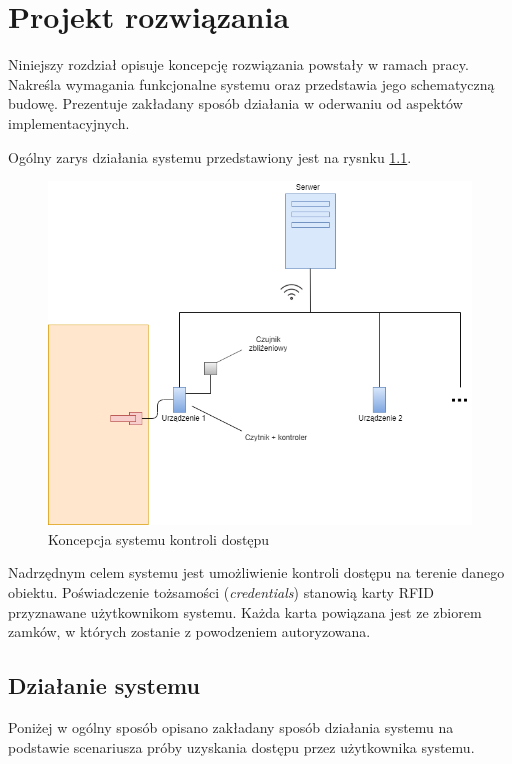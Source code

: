 \chapter{Projekt rozwiązania}
\label{chap:hl-arch}

        Niniejszy rozdział opisuje koncepcję rozwiązania powstały w ramach pracy. Nakreśla wymagania funkcjonalne systemu oraz przedstawia jego schematyczną budowę. Prezentuje zakładany sposób działania w oderwaniu od aspektów implementacyjnych.

        Ogólny zarys działania systemu przedstawiony jest na rysnku \ref{fig:door}.

        \begin{figure}[]
                \includegraphics[width=\linewidth]{chapters/images/door2.png}
                \caption{Koncepcja systemu kontroli dostępu}
                \label{fig:door}
        \end{figure}

        Nadrzędnym celem systemu jest umożliwienie kontroli dostępu na terenie danego obiektu. Poświadczenie tożsamości (\textit{credentials}) stanowią karty RFID przyznawane użytkownikom systemu. Każda karta powiązana jest ze zbiorem zamków, w których zostanie z powodzeniem autoryzowana.

        \section{Działanie systemu}
                Poniżej w ogólny sposób opisano zakładany sposób działania systemu na podstawie scenariusza próby uzyskania dostępu przez użytkownika systemu.

